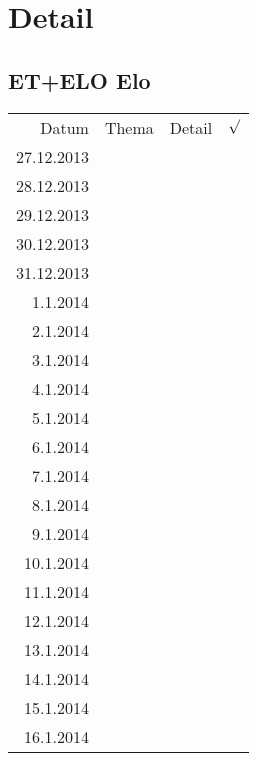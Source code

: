 
\section{Detail}

\subsection{ET+ELO Elo}
\begin{tabular}{r l p{} l}
\rowcolor{lgray} Datum       & Thema         & Detail & $\surd$ \\
\rowcolor{white}  27.12.2013 &               &  &  \\
\rowcolor{lgray}  28.12.2013 &               &  &  \\
\rowcolor{white}  29.12.2013 &               &  &  \\
\rowcolor{lgray}  30.12.2013 &               &  &  \\
\rowcolor{white}  31.12.2013 &               &  &  \\
\rowcolor{lgray}    1.1.2014 &               &  &  \\
\rowcolor{white}    2.1.2014 &               &  &  \\
\rowcolor{lgray}    3.1.2014 &               &  &  \\
\rowcolor{white}    4.1.2014 &               &  &  \\
\rowcolor{lgray}    5.1.2014 &               &  &  \\
\rowcolor{white}    6.1.2014 &               &  &  \\
\rowcolor{lgray}    7.1.2014 &               &  &  \\
\rowcolor{white}    8.1.2014 &               &  &  \\
\rowcolor{lgray}    9.1.2014 &               &  &  \\
\rowcolor{white}   10.1.2014 &               &  &  \\
\rowcolor{lgray}   11.1.2014 &               &  &  \\
\rowcolor{white}   12.1.2014 &               &  &  \\
\rowcolor{lgray}   13.1.2014 &               &  &  \\
\rowcolor{white}   14.1.2014 &               &  &  \\
\rowcolor{lgray}   15.1.2014 &               &  &  \\
\rowcolor{white}   16.1.2014 &               &  &  \\

\end{tabular}
